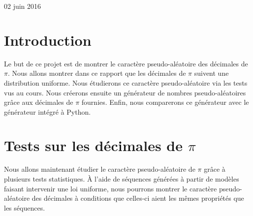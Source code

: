 \documentclass[10pt,a4paper]{article}
\begin{document}
\begin{titlepage}

{\large 02 juin 2016}\\[3cm] %


 

\vfill %

\end{titlepage}

\newpage
\tableofcontents
\newpage

\section{Introduction}
	Le but de ce projet est de montrer le caractère pseudo-aléatoire des décimales de $\pi$. Nous allons montrer dans ce rapport que les 
décimales de $\pi$ suivent une distribution uniforme. Nous étudierons ce caractère pseudo-aléatoire via les tests vus au cours. Nous
créerons ensuite un générateur de nombres pseudo-aléatoires grâce aux décimales de $\pi$ fournies. Enfin, nous comparerons ce générateur
avec le générateur intégré à Python.

\section{Tests sur les décimales de $\pi$}

Nous allons maintenant étudier le caractère pseudo-aléatoire de $\pi$ grâce à plusieurs tests statistiques. \`A l'aide de séquences générées à partir de modèles faisant intervenir une loi uniforme, nous pourrons montrer le caractère pseudo-aléatoire des décimales à conditions que celles-ci aient les mêmes propriétés que les séquences.
\end{document}
